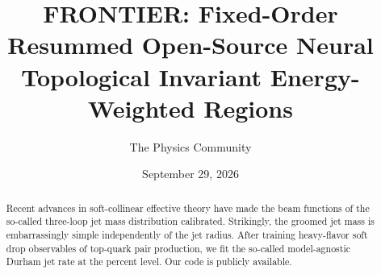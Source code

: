 \documentclass[11pt]{article}
\title{FRONTIER: Fixed-Order Resummed Open-Source Neural Topological Invariant Energy-Weighted Regions}
\author{The Physics Community}
\date{September 29, 2026}
\numberwithin{equation}{section}
\theoremstyle{definition}
\theoremstyle{remark}
\begin{document}
\maketitle
\begin{abstract}
Recent advances in soft-collinear effective theory have made the beam
functions of the so-called three-loop jet mass distribution calibrated.
Strikingly, the groomed jet mass is embarrassingly simple independently
of the jet radius. After training heavy-flavor soft drop observables of
top-quark pair production, we fit the so-called model-agnostic Durham
jet rate at the percent level. Our code is publicly available.
\end{abstract}
\tableofcontents




\nocite{*}


\end{document}
